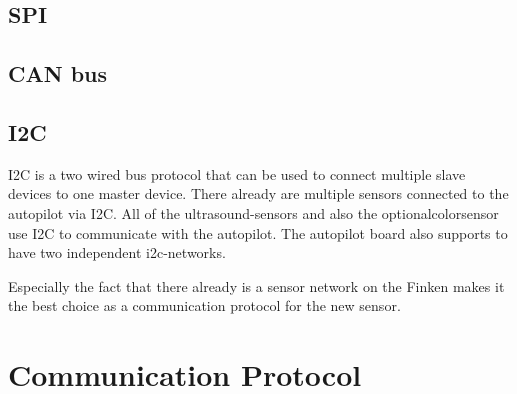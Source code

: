 \subsection{SPI}

\subsection{CAN bus}

\subsection{I2C}
I2C is a two wired bus protocol that can be used to connect multiple slave devices to one master device.
There already are multiple sensors connected to the autopilot via I2C.
All of the ultrasound-sensors and also the optionalcolorsensor use I2C to communicate with the autopilot.
The autopilot board also supports to have two independent i2c-networks.

Especially the fact that there already is a sensor network on the Finken makes it the best choice as a communication protocol for the new sensor.


\section{Communication Protocol}




